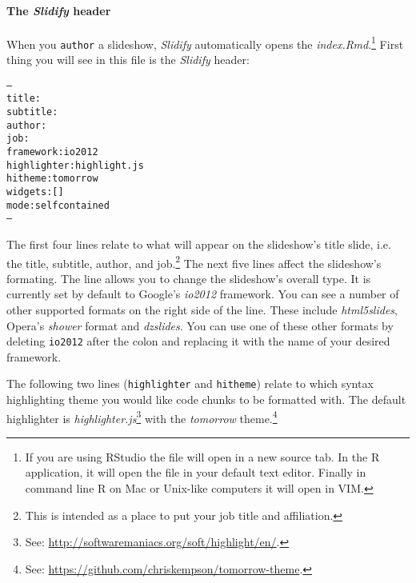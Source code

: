 \paragraph{The \emph{Slidify} header}

When you \verb|author| a slideshow, \emph{Slidify} automatically opens the \emph{index.Rmd}.\footnote{If you are using RStudio the file will open in a new source tab. In the R application, it will open the file in your default text editor. Finally in command line R on Mac or Unix-like computers it will open in VIM.} First thing you will see in this file is the \emph{Slidify} header:

{\small
\begin{knitrout}
\color{fgcolor}\begin{kframe}
\begin{alltt}
---
title       : 
subtitle    : 
author      : 
job         : 
framework   : io2012        
highlighter : highlight.js  
hitheme     : tomorrow      \hlcomment{# }
widgets     : []            
mode        : selfcontained 
---
\end{alltt}
\end{kframe}
\end{knitrout}

}

The first four lines relate to what will appear on the slideshow's title slide, i.e. the title, subtitle, author, and job.\footnote{This is intended as a place to put your job title and affiliation.}  The next five lines affect the slideshow's formating. The  line allows you to change the slideshow's overall type. It is currently set by default to Google's \emph{io2012} framework. You can see a number of other supported formats on the right side of the line. These include \emph{html5slides}, Opera's \emph{shower} format and \emph{dzslides}. You can use one of these other formats by deleting \texttt{io2012} after the colon and replacing it with the name of your desired framework.

The following two lines (\texttt{highlighter} and \texttt{hitheme}) relate to which syntax highlighting theme you would like code chunks to be formatted with. The default highlighter is \emph{highlighter.js}\footnote{See: \url{http://softwaremaniacs.org/soft/highlight/en/}.} with the \emph{tomorrow} theme.\footnote{See: \url{https://github.com/chriskempson/tomorrow-theme}.}

